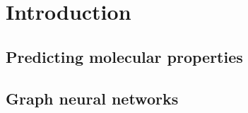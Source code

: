 \chapter{Introduction}
\label{chapter:Introduction}

\section{Predicting molecular properties}

\section{Graph neural networks}